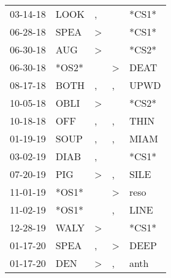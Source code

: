 \begin{supertabular}{lllll}
 03-14-18 &   LOOK &             , &               &  *CS1* \\
 06-28-18 &   SPEA &  \textgreater &               &  *CS1* \\
 06-30-18 &    AUG &  \textgreater &               &  *CS2* \\
 06-30-18 &  *OS2* &               &  \textgreater &   DEAT \\
 08-17-18 &   BOTH &             , &             , &   UPWD \\
 10-05-18 &   OBLI &  \textgreater &               &  *CS2* \\
 10-18-18 &    OFF &             , &             , &   THIN \\
 01-19-19 &   SOUP &             , &             , &   MIAM \\
 03-02-19 &   DIAB &             , &               &  *CS1* \\
 07-20-19 &    PIG &  \textgreater &             , &   SILE \\
 11-01-19 &  *OS1* &               &  \textgreater &   reso \\
 11-02-19 &  *OS1* &               &             , &   LINE \\
 12-28-19 &   WALY &  \textgreater &               &  *CS1* \\
 01-17-20 &   SPEA &             , &  \textgreater &   DEEP \\
 01-17-20 &    DEN &  \textgreater &             , &   anth \\
\end{supertabular}
